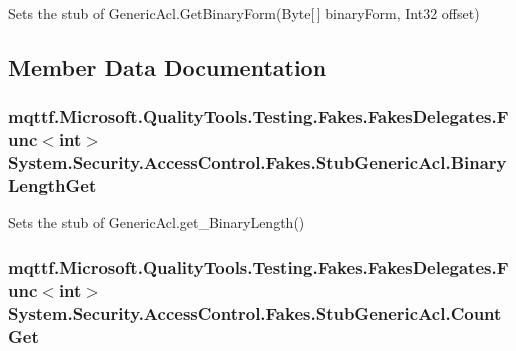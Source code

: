 Sets the stub of Generic\-Acl.\-Get\-Binary\-Form(\-Byte\mbox{[}$\,$\mbox{]} binary\-Form, Int32 offset)



\subsection{Member Data Documentation}
\hypertarget{class_system_1_1_security_1_1_access_control_1_1_fakes_1_1_stub_generic_acl_abacad6ce30a6b464cd58fb5358040c51}{
\subsubsection[{Binary\-Length\-Get}]{\setlength{\rightskip}{0pt plus 5cm}mqttf.\-Microsoft.\-Quality\-Tools.\-Testing.\-Fakes.\-Fakes\-Delegates.\-Func$<$int$>$ System.\-Security.\-Access\-Control.\-Fakes.\-Stub\-Generic\-Acl.\-Binary\-Length\-Get}}\label{class_system_1_1_security_1_1_access_control_1_1_fakes_1_1_stub_generic_acl_abacad6ce30a6b464cd58fb5358040c51}


Sets the stub of Generic\-Acl.\-get\-\_\-\-Binary\-Length()

\hypertarget{class_system_1_1_security_1_1_access_control_1_1_fakes_1_1_stub_generic_acl_a1d35d17843d159fb715241fbe6bea973}{
\subsubsection[{Count\-Get}]{\setlength{\rightskip}{0pt plus 5cm}mqttf.\-Microsoft.\-Quality\-Tools.\-Testing.\-Fakes.\-Fakes\-Delegates.\-Func$<$int$>$ System.\-Security.\-Access\-Control.\-Fakes.\-Stub\-Generic\-Acl.\-Count\-Get}}\label{class_system_1_1_security_1_1_access_control_1_1_fakes_1_1_stub_generic_acl_a1d35d17843d159fb715241fbe6bea973}



